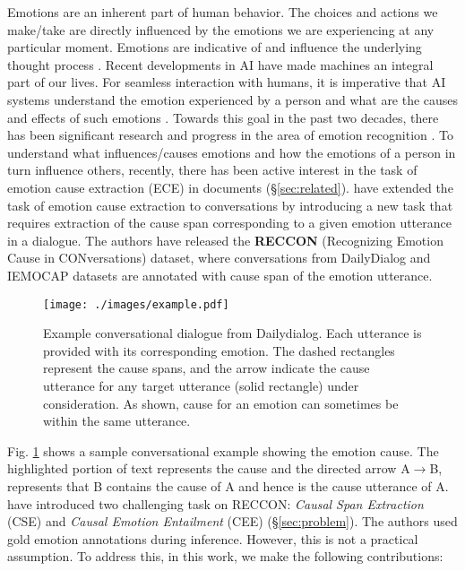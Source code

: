 \documentclass{article}
\begin{document}
Emotions are an inherent part of human behavior. The choices and actions we make/take are directly influenced by the emotions we are experiencing at any particular moment. Emotions are indicative of and influence the underlying thought process \citep{minsky2007emotion}. Recent developments in AI have made machines an integral part of our lives. For seamless interaction with humans, it is imperative that AI systems understand the emotion experienced by a person and what are the causes and effects of such emotions \cite{singh-etal-2021-end}. Towards this goal in the past two decades, there has been significant research and progress in the area of emotion recognition \cite{9330790}. To understand what influences/causes emotions and how the emotions of a person in turn influence others, recently, there has been active interest in the task of emotion cause extraction (ECE) in documents (\S \ref{sec:related}). \citet{poria2020recognizing} have extended the task of emotion cause extraction to conversations by introducing a new task that requires extraction of the cause span corresponding to a given emotion utterance in a dialogue. The authors have released the \textbf{RECCON} (Recognizing Emotion Cause in CONversations) dataset, where conversations from DailyDialog \cite{li-etal-2017-dailydialog} and IEMOCAP \cite{busso2008iemocap} datasets are annotated with cause span of the emotion utterance. 
\begin{figure}[t]
\centering
\texttt{[image: ./images/example.pdf]}
\caption{Example conversational dialogue from Dailydialog. Each utterance is provided with its corresponding emotion. The dashed rectangles represent the cause spans, and the arrow indicate the cause utterance for any target utterance (solid rectangle) under consideration. As shown, cause for an emotion can sometimes be within the same utterance.}
\label{fig:example}
\vspace{-6mm}
\end{figure}
Fig. \ref{fig:example} shows a sample conversational example showing the emotion cause. The highlighted portion of text represents the cause and the directed arrow A$\rightarrow$B, represents that B contains the cause of A and hence is the cause utterance of A. \citet{poria2020recognizing} have introduced two challenging task on RECCON: \textit{Causal Span Extraction} (CSE) and \textit{Causal Emotion Entailment} (CEE) (\S \ref{sec:problem}). The authors used gold emotion annotations during inference. However, this is not a practical assumption. To address this, in this work, we make the following contributions: 
\end{document}
